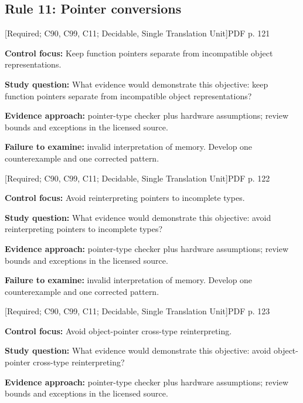\documentclass[10pt,letterpaper]{article}
\begin{document}
\subsection{Rule 11: Pointer conversions}
 \textsf{\footnotesize [Required; C90, C99, C11; Decidable, Single Translation Unit]}\hfill{\footnotesize PDF p. 121}\par
\textbf{Control focus:} Keep function pointers separate from incompatible object representations.\par
\textbf{Study question:} What evidence would demonstrate this objective: keep function pointers separate from incompatible object representations?\par
\textbf{Evidence approach:} pointer-type checker plus hardware assumptions; review bounds and exceptions in the licensed source.\par
\textbf{Failure to examine:} invalid interpretation of memory. Develop one counterexample and one corrected pattern.\par
\smallskip
{}
 \textsf{\footnotesize [Required; C90, C99, C11; Decidable, Single Translation Unit]}\hfill{\footnotesize PDF p. 122}\par
\textbf{Control focus:} Avoid reinterpreting pointers to incomplete types.\par
\textbf{Study question:} What evidence would demonstrate this objective: avoid reinterpreting pointers to incomplete types?\par
\textbf{Evidence approach:} pointer-type checker plus hardware assumptions; review bounds and exceptions in the licensed source.\par
\textbf{Failure to examine:} invalid interpretation of memory. Develop one counterexample and one corrected pattern.\par
\smallskip
{}
 \textsf{\footnotesize [Required; C90, C99, C11; Decidable, Single Translation Unit]}\hfill{\footnotesize PDF p. 123}\par
\textbf{Control focus:} Avoid object-pointer cross-type reinterpreting.\par
\textbf{Study question:} What evidence would demonstrate this objective: avoid object-pointer cross-type reinterpreting?\par
\textbf{Evidence approach:} pointer-type checker plus hardware assumptions; review bounds and exceptions in the licensed source.\par
\end{document}
